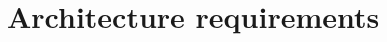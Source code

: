 \documentclass[12pt]{article}
\begin{document}


\newpage
\tableofcontents

\newpage
\listoffigures

\newpage

\section{Architecture requirements}
	

	

	

	

	

	

	
	
	

	

	
\end{document}
